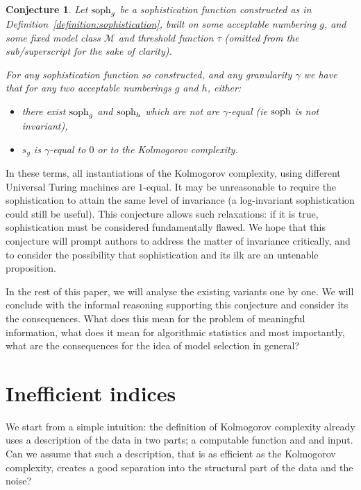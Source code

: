 \documentclass{style/llncs}
\newcommand{\M}{\mathscr M}
\newcommand{\tn}[1]{\textnormal{#1}}
\newcommand{\s}{\tn{soph}}
\newtheorem{conj}{Conjecture}
\begin{document}
\begin{conj}
Let $\s_g$ be a sophistication function constructed as in Definition~\ref{definition:sophistication}, built on some acceptable numbering $g$, and some fixed model class $\M$ and threshold function $\tau$ (omitted from the sub/superscript for the sake of clarity). 

For any sophistication function so constructed, and any granularity $\gamma$ we have that for any two acceptable numberings $g$ and $h$, either:
\begin{itemize}
  \item there exist $\s_g$ and $\s_h$ which are not are $\gamma$-equal (ie $\s$ is not invariant),
  \item $s_g$ is $\gamma$-equal to $0$ or to the Kolmogorov complexity.
\end{itemize}
\end{conj}

In these terms, all instantiations of the Kolmogorov complexity, using different Universal Turing machines are $1$-equal. It may be unreasonable to require the sophistication to attain the same level of invariance (a log-invariant sophistication could still be useful). This conjecture allows such relaxations: if it is true, sophistication must be considered fundamentally flawed. We hope that this conjecture will prompt authors to address the matter of invariance critically, and to consider the possibility that sophistication and its ilk are an untenable proposition.

In the rest of this paper, we will analyse the existing variants one by one. We will conclude with the informal reasoning supporting this conjecture and consider its the consequences. What does this mean for the problem of meaningful information, what does it mean for algorithmic statistics and most importantly, what are the consequences for the idea of model selection in general?

\section{Inefficient indices}

We start from a simple intuition: the definition of Kolmogorov complexity already uses a description of the data in two parts; a computable function and and input. Can we assume that such a description, that is as efficient as the Kolmogorov complexity, creates a good separation into the structural part of the data and the noise?
\end{document}

